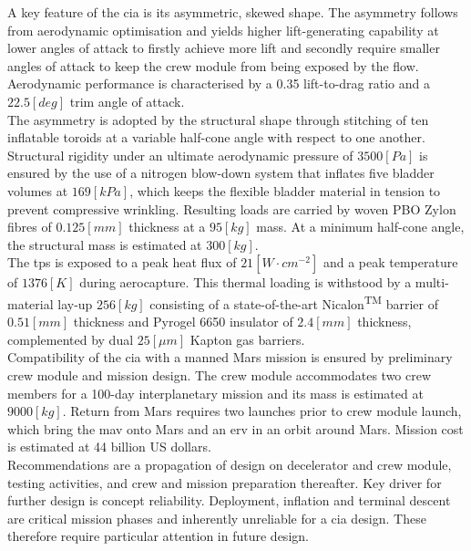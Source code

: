 A key feature of the \acrshort{cia} is its asymmetric, skewed shape. The asymmetry follows from aerodynamic optimisation and yields higher lift-generating capability at lower angles of attack to firstly achieve more lift and secondly require smaller angles of attack to keep the crew module from being exposed by the flow. Aerodynamic performance is characterised by a 0.35 lift-to-drag ratio and a $22.5\left[deg\right]$ trim angle of attack.\\

The asymmetry is adopted by the structural shape through stitching of ten inflatable toroids at a variable half-cone angle with respect to one another. Structural rigidity under an ultimate aerodynamic pressure of $3500 \left[Pa\right]$ is ensured by the use of a nitrogen blow-down system that inflates five bladder volumes at $169 \left[kPa\right]$, which keeps the flexible bladder material in tension to prevent compressive wrinkling. Resulting loads are carried by woven PBO Zylon\textsuperscript{\textregistered} fibres of $0.125 \left[mm\right]$ thickness at a $95 \left[kg\right]$ mass. At a minimum half-cone angle, the structural mass is estimated at $300 \left[kg\right]$. \\

The \acrlong{tps} is exposed to a peak heat flux of $21 \left[W \cdot cm^{-2}\right]$ and a peak temperature of $1376 \left[K\right]$ during aerocapture. This thermal loading is withstood by a multi-material lay-up $256 \left[kg\right]$ consisting of a state-of-the-art Nicalon\textsuperscript{TM} barrier of $0.51 \left[mm\right]$ thickness and Pyrogel\textsuperscript{\textregistered} 6650 insulator of $2.4 \left[mm\right]$ thickness, complemented by dual $25 \left[\mu m\right]$ Kapton gas barriers. \\

Compatibility of the \acrshort{cia} with a manned Mars mission is ensured by preliminary crew module and mission design. The crew module accommodates two crew members for a 100-day interplanetary mission and its mass is estimated at $9000 \left[kg\right]$. Return from Mars requires two launches prior to crew module launch, which bring the \acrlong{mav} onto Mars and an \acrlong{erv} in an orbit around Mars. Mission cost is estimated at 44 billion US dollars.\\

Recommendations are a propagation of design on decelerator and crew module, testing activities, and crew and mission preparation thereafter. Key driver for further design is concept reliability. Deployment, inflation and terminal descent are critical mission phases and inherently unreliable for a \acrshort{cia} design. These therefore require particular attention in future design.